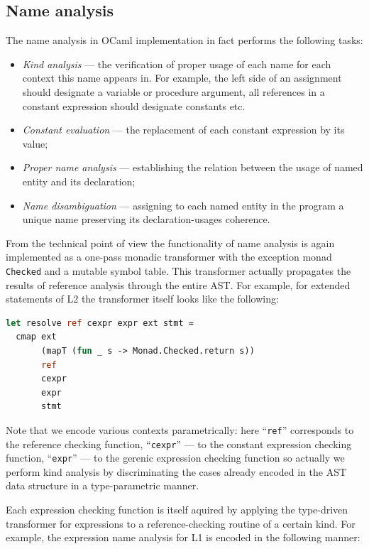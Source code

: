 \subsection{Name analysis}

The name analysis in OCaml implementation in fact performs the following tasks:

\begin{itemize}
\item \emph{Kind analysis} --- the verification of proper usage of each name for each context this
name appears in. For example, the left side of an assignment should designate a variable or procedure argument,
all references in a constant expression should designate constants etc.
\item \emph{Constant evaluation} --- the replacement of each constant expression by
its value;
\item \emph{Proper name analysis} --- establishing the relation between the usage of
named entity and its declaration;
\item \emph{Name disambiguation} --- assigning to each named entity in the program a unique
name preserving its declaration-usages coherence.
\end{itemize}

From the technical point of view the functionality of name analysis is again implemented as a 
one-pass monadic transformer with the exception monad \lstinline{Checked} and a mutable symbol 
table. This transformer actually propagates the results of reference analysis through the 
entire AST. For example, for extended statements of L2 the transformer itself looks like
the following:

\begin{lstlisting}[language=ocaml]
let resolve ref cexpr expr ext stmt =
  cmap ext 
       (mapT (fun _ s -> Monad.Checked.return s)) 
       ref 
       cexpr 
       expr 
       stmt
\end{lstlisting}

Note that we encode various contexts parametrically: here ``\lstinline{ref}'' corresponds
to the reference checking function, ``\lstinline{cexpr}'' --- to the constant expression 
checking function, ``\lstinline{expr}'' --- to the gerenic expression checking function
so actually we perform kind analysis by discriminating the cases already encoded in
the AST data structure in a type-parametric manner. 

Each expression checking function is itself aquired by applying the type-driven transformer 
for expressions to a reference-checking routine of a certain kind. For example, the expression 
name analysis for L1 is encoded in the following manner:

